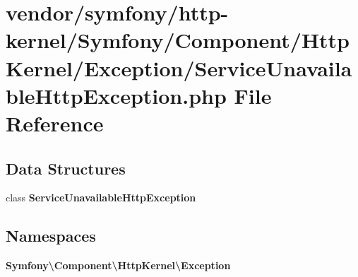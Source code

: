 \section{vendor/symfony/http-\/kernel/\+Symfony/\+Component/\+Http\+Kernel/\+Exception/\+Service\+Unavailable\+Http\+Exception.php File Reference}
\label{_service_unavailable_http_exception_8php}
\subsection*{Data Structures}
\begin{DoxyCompactItemize}
\item 
class {\bf Service\+Unavailable\+Http\+Exception}
\end{DoxyCompactItemize}
\subsection*{Namespaces}
\begin{DoxyCompactItemize}
\item 
 {\bf Symfony\textbackslash{}\+Component\textbackslash{}\+Http\+Kernel\textbackslash{}\+Exception}
\end{DoxyCompactItemize}
